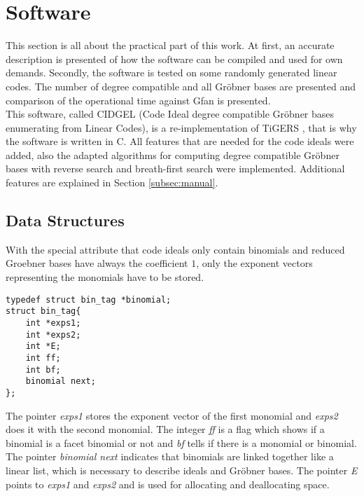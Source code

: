 \section{Software}
\label{sec:software}
This section is all about the practical part of this work. At first, an accurate description is presented of how the software can be compiled and used for own demands.
Secondly, the software is tested on some randomly generated linear codes. The number of degree compatible and all Gröbner bases are presented and comparison of the operational time against Gfan \cite{gfan} is presented. \\
This software, called CIDGEL (Code Ideal degree compatible Gröbner bases enumerating from Linear Codes), is a re-implementation of TiGERS \cite{tigers}, that is why the software is written in C. All features that are needed for the code ideals were added, also the adapted algorithms for computing degree compatible Gröbner bases with reverse search and breath-first search were implemented.   
Additional features are explained in Section \ref{subsec:manual}.


\subsection{Data Structures}
\label{subsec:datastructure}
With the special attribute that code ideals only contain binomials and reduced Groebner bases have always the coefficient $1$, only the exponent vectors representing the monomials have to be stored.


\begin{lstlisting} 
typedef struct bin_tag *binomial;
struct bin_tag{
    int *exps1;
    int *exps2;
    int *E;
    int ff;
    int bf;
    binomial next;
};

\end{lstlisting}
\newpage
The pointer \emph{exps1} stores the exponent vector of the first monomial and \emph{exps2} does it with the second monomial.
The integer \emph{ff} is a flag which shows if a binomial is a facet binomial or not and \emph{bf} tells if there is a monomial or binomial.
The pointer \emph{binomial next} indicates that binomials are linked together like a linear list, which is necessary to describe ideals and Gröbner bases. The pointer \emph{E} points to \emph{exps1} and \emph{exps2} and is used for allocating and deallocating space. \\

